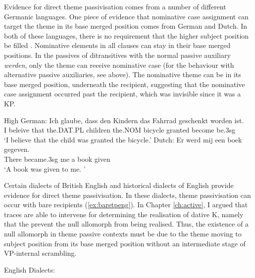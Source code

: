 Evidence for direct theme passivisation comes from a number of different Germanic languages. One piece of evidence that nominative case assignment can target the theme in its base merged position comes from German and Dutch. In both of these languages, there is no requirement that the higher subject position be filled \citep{Besten.1990}. Nominative elements in all clauses can stay in their base merged positions. In the passives of ditransitives with the normal passive auxiliary \textit{werden}, only the theme can receive nominative case (for the behaviour with alternative passive auxiliaries, see above). The nominative theme can be in its base merged position, underneath the recipient, suggesting that the nominative case assignment occurred past the recipient, which was invisible since it was a KP.

\begin{exe}
\ex High German:
\gll Ich glaube, dass den Kindern das Fahrrad geschenkt worden ist.\\
I beleive that the.DAT.PL children the.NOM bicycle granted become be.3sg\\
\trans `I believe that the child was granted the bicycle.'
\ex Dutch:
\gll Er werd mij een boek gegeven.\\
There became.3sg me a book given\\
\trans `A book was given to me. \cite[pg 245]{Donaldson.2008}'
\end{exe}

Certain dialects of British English and historical dialects of English provide evidence for direct theme passivisation. In these dialects, theme passivisation can occur with bare recipients (\ref{ex:baretpeng}). In Chapter \ref{ch:active}, I argued that traces are able to intervene for determining the realisation of dative K, namely that the prevent the null allomorph from being realised. Thus, the existence of a null allomorph in theme passive contexts must be due to the theme moving to subject position from its base merged position without an intermediate stage of VP-internal scrambling.

\begin{exe}
	\ex English Dialects: 
		\begin{xlist}
		\end{xlist}
\end{exe}

